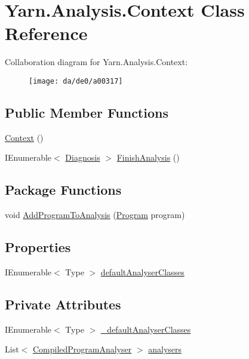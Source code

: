\hypertarget{a00031}{\section{Yarn.\-Analysis.\-Context Class Reference}
\label{a00031}
}


Collaboration diagram for Yarn.\-Analysis.\-Context\-:
\nopagebreak
\begin{figure}[H]
\begin{center}
\leavevmode
\texttt{[image: da/de0/a00317]}
\end{center}
\end{figure}
\subsection*{Public Member Functions}
\begin{DoxyCompactItemize}
\item 
\hyperlink{a00031_a8e2c56843e8d374b0f90e23326d8d14a}{Context} ()
\item 
I\-Enumerable$<$ \hyperlink{a00035}{Diagnosis} $>$ \hyperlink{a00031_a1eadea062a5899a64d00ea0172cbbb43}{Finish\-Analysis} ()
\end{DoxyCompactItemize}
\subsection*{Package Functions}
\begin{DoxyCompactItemize}
\item 
void \hyperlink{a00031_a60255a6d54f296d199507acef251244c}{Add\-Program\-To\-Analysis} (\hyperlink{a00067}{Program} program)
\end{DoxyCompactItemize}
\subsection*{Properties}
\begin{DoxyCompactItemize}
\item 
I\-Enumerable$<$ Type $>$ \hyperlink{a00031_afdf24f2512251c2203ba1bde8f4a0f90}{default\-Analyser\-Classes}
\end{DoxyCompactItemize}
\subsection*{Private Attributes}
\begin{DoxyCompactItemize}
\item 
I\-Enumerable$<$ Type $>$ \hyperlink{a00031_ad06829cf848a5936db5724ebced758ec}{\-\_\-default\-Analyser\-Classes}
\item 
List$<$ \hyperlink{a00028}{Compiled\-Program\-Analyser} $>$ \hyperlink{a00031_aa5c7eaa90ad9c47969a3b336080d8991}{analysers}
\end{DoxyCompactItemize}


